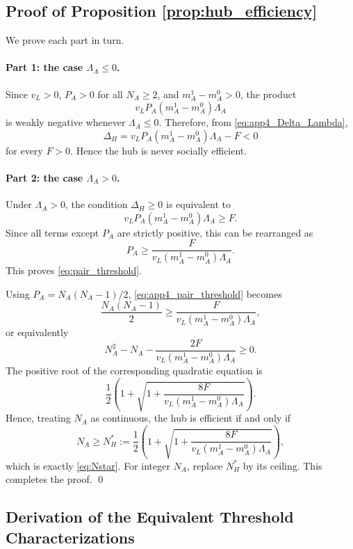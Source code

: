 \subsection{Proof of Proposition \ref{prop:hub_efficiency}}

We prove each part in turn.

\paragraph{Part 1: the case $\Lambda_A\le 0$.}
Since $v_L>0$, $P_A>0$ for all $N_A\ge 2$, and $m_A^1-m_A^0>0$, the product
\[
v_L P_A(m_A^1-m_A^0)\Lambda_A
\]
is weakly negative whenever $\Lambda_A\le 0$. Therefore, from \eqref{eq:app4_Delta_Lambda},
\[
\Delta_H
=
v_L P_A(m_A^1-m_A^0)\Lambda_A-F
<0
\]
for every $F>0$. Hence the hub is never socially efficient.

\paragraph{Part 2: the case $\Lambda_A>0$.}
Under $\Lambda_A>0$, the condition $\Delta_H\ge 0$ is equivalent to
\[
v_L P_A(m_A^1-m_A^0)\Lambda_A\ge F.
\]
Since all terms except $P_A$ are strictly positive, this can be rearranged as
\begin{equation}
P_A
\ge
\frac{F}{v_L(m_A^1-m_A^0)\Lambda_A}.
\label{eq:app4_pair_threshold}
\end{equation}
This proves \eqref{eq:pair_threshold}.

Using $P_A=N_A(N_A-1)/2$, \eqref{eq:app4_pair_threshold} becomes
\[
\frac{N_A(N_A-1)}{2}
\ge
\frac{F}{v_L(m_A^1-m_A^0)\Lambda_A},
\]
or equivalently
\[
N_A^2-N_A-\frac{2F}{v_L(m_A^1-m_A^0)\Lambda_A}\ge 0.
\]
The positive root of the corresponding quadratic equation is
\[
\frac{1}{2}\left(
1+\sqrt{1+\frac{8F}{v_L(m_A^1-m_A^0)\Lambda_A}}
\right).
\]
Hence, treating $N_A$ as continuous, the hub is efficient if and only if
\begin{equation}
N_A\ge
N_H^*
:=
\frac{1}{2}\left(
1+\sqrt{1+\frac{8F}{v_L(m_A^1-m_A^0)\Lambda_A}}
\right),
\label{eq:app4_Nstar}
\end{equation}
which is exactly \eqref{eq:Nstar}. For integer $N_A$, replace $N_H^*$ by its ceiling. This completes the proof.
\qed

\subsection{Derivation of the Equivalent Threshold Characterizations}

